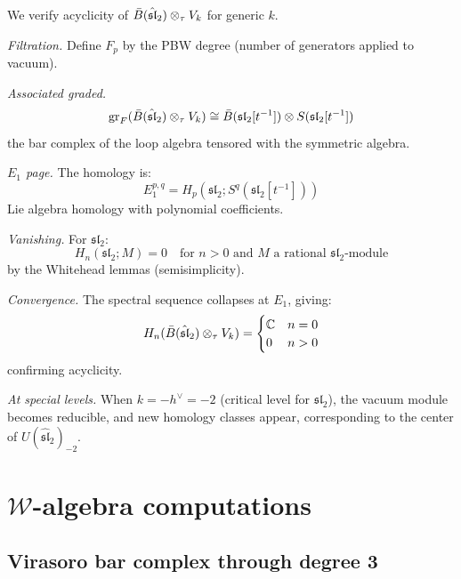 \begin{computation}\label{comp:km-acyclic}
We verify acyclicity of $\bar{B}(\hat{\mathfrak{sl}}_2) \otimes_\tau V_k$ for generic $k$.

\emph{Filtration.} Define $F_p$ by the PBW degree (number of generators applied to vacuum).

\emph{Associated graded.}
\[
\mathrm{gr}_F(\bar{B}(\hat{\mathfrak{sl}}_2) \otimes_\tau V_k) \cong \bar{B}(\mathfrak{sl}_2[t^{-1}]) \otimes S(\mathfrak{sl}_2[t^{-1}])
\]
the bar complex of the loop algebra tensored with the symmetric algebra.

\emph{$E_1$ page.} The homology is:
\[
E_1^{p,q} = H_p(\mathfrak{sl}_2; S^q(\mathfrak{sl}_2[t^{-1}]))
\]
Lie algebra homology with polynomial coefficients.

\emph{Vanishing.} For $\mathfrak{sl}_2$:
\[
H_n(\mathfrak{sl}_2; M) = 0 \quad \text{for } n > 0 \text{ and } M \text{ a rational } \mathfrak{sl}_2\text{-module}
\]
by the Whitehead lemmas (semisimplicity).

\emph{Convergence.} The spectral sequence collapses at $E_1$, giving:
\[
H_n(\bar{B}(\hat{\mathfrak{sl}}_2) \otimes_\tau V_k) = \begin{cases}
\mathbb{C} & n = 0 \\
0 & n > 0
\end{cases}
\]
confirming acyclicity.

\emph{At special levels.} When $k = -h^\vee = -2$ (critical level for $\mathfrak{sl}_2$), 
the vacuum module becomes reducible, and new homology classes appear, corresponding 
to the center of $U(\hat{\mathfrak{sl}}_2)_{-2}$.
\end{computation}


\section{$\mathcal{W}$-algebra computations}
\label{sec:w-algebra-details}

\subsection{Virasoro bar complex through degree 3}

